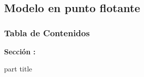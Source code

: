 \subsection{Modelo en punto flotante}
\begin{frame}
  \frametitle{\textbf{Tabla de Contenidos}}
  \begin{center}
    {\vspace{-1.5cm}\Large \textbf{Sección \thesection: \secname }\vspace{0.5cm}}
    \begin{beamercolorbox}[
      sep=8pt,center]{part title}
      \textbf{\subsecname}
    \end{beamercolorbox}
  \end{center}
\end{frame}

